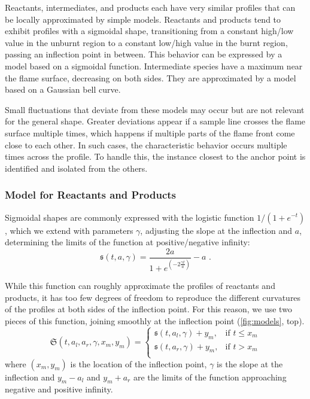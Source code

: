 %
Reactants, intermediates, and products each have very similar profiles that can
be locally approximated by simple models.
%
Reactants and products tend to exhibit profiles with a sigmoidal shape,
transitioning from a constant high/low value in the unburnt region to a constant
low/high value in the burnt region, passing an inflection point in between.
%
This behavior can be expressed by a model based on a sigmoidal function.
%
Intermediate species have a maximum near the flame surface, decreasing on both
sides.
%
They are approximated by a model based on a Gaussian bell curve.
%

%
Small fluctuations that deviate from these models may occur but are not relevant
for the general shape.
%
Greater deviations appear if a sample line crosses the flame surface multiple
times, which happens if multiple parts of the flame front come close to each
other.
%
In such cases, the characteristic behavior occurs multiple times across the
profile.
%
To handle this, the instance closest to the anchor point is identified and
isolated from the others.
%
\subsubsection{Model for Reactants and Products} %
\label{ssub:model_for_reactants_products}
%
Sigmoidal shapes are commonly expressed with the logistic function
$1/(1+e^{-t})$, which we extend with parameters $\gamma$, adjusting the slope at
the inflection and $a$, determining the limits of the function at
positive/negative infinity:
%
%
\begin{equation}
	\mathfrak{s}(t,a,\gamma)
		= \frac{2a}{ 1 + e^{ (-2\frac{\gamma t}{a}) } } - a \text{ .}
\end{equation}
%

%
While this function can roughly approximate the profiles of reactants and
products, it has too few degrees of freedom to reproduce the different
curvatures of the profiles at both sides of the inflection point.
%
For this reason, we use two pieces of this function, joining smoothly at the
inflection point (\cref{fig:models}, top).
%
\begin{equation}
		\mathfrak{S}(t, a_l, a_r, \gamma, x_m, y_m) =
		\begin{cases}
			\mathfrak{s}(t, a_l, \gamma) + y_m, &\text{if }  t \leq x_m\\
			\mathfrak{s}(t, a_r, \gamma) + y_m, & \text{if }  t > x_m\\
		\end{cases}
\end{equation}
%
where $(x_m, y_m)$ is the location of the
inflection point, $\gamma$ is the slope at the inflection and $y_m-a_l$ and
$y_m+a_r$ are the limits of the function approaching negative and positive
infinity.
%
%
